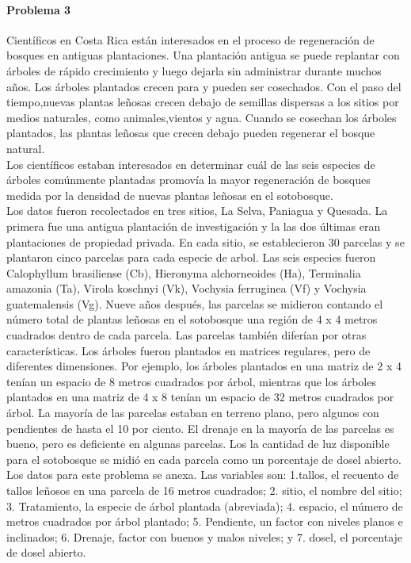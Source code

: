 \documentclass[12pt,a4paper]{report}
\begin{document}
\begin{enumerate}
\paragraph{Problema 3}
Científicos en Costa Rica están interesados en el proceso de regeneración de bosques en antiguas plantaciones. Una plantación antigua se puede replantar con árboles de rápido crecimiento y luego dejarla sin administrar durante muchos años. Los árboles plantados crecen para y pueden ser cosechados. Con el paso del tiempo,nuevas plantas leñosas crecen debajo de semillas dispersas a los sitios por medios naturales, como animales,vientos y agua. Cuando se cosechan los árboles plantados, las plantas leñosas que crecen debajo pueden regenerar el bosque natural.\\

Los científicos estaban interesados en determinar cuál de las seis especies de árboles comúnmente plantadas promovía la mayor regeneración de bosques medida por la densidad de nuevas plantas leñosas en el sotobosque.\\
Los datos fueron recolectados en tres sitios, La Selva, Paniagua y Quesada. La primera fue una antigua
plantación de investigación y la las dos últimas eran plantaciones de propiedad privada. En cada sitio, se establecieron 30 parcelas y se plantaron cinco parcelas para cada especie de arbol. Las seis especies fueron Calophyllum brasiliense (Cb), Hieronyma alchorneoides (Ha), Terminalia amazonia (Ta), Virola koschnyi (Vk), Vochysia ferruginea (Vf) y Vochysia guatemalensis (Vg). Nueve años después, las parcelas se midieron contando el número total de plantas leñosas en el sotobosque una región de 4 x 4 metros cuadrados dentro de cada parcela. Las parcelas también diferían por otras características. Los árboles fueron plantados en matrices regulares, pero de diferentes dimensiones. Por ejemplo, los árboles plantados en una matriz de 2 x 4 tenían un espacio de 8 metros cuadrados por árbol, mientras que los árboles plantados en una matriz de 4 x 8 tenían un espacio de 32 metros cuadrados por árbol. La mayoría de las parcelas estaban en terreno plano, pero algunos con pendientes de hasta el 10 por ciento. El drenaje en la mayoría de las parcelas es bueno, pero es deficiente en algunas parcelas. Los la cantidad de luz disponible para el sotobosque se midió en cada parcela como un porcentaje de dosel abierto. Los datos para este problema se anexa. Las variables son: 1.tallos, el recuento de tallos leñosos en una parcela de 16 metros cuadrados; 2. sitio, el nombre del sitio; 3. Tratamiento, la especie de árbol plantada (abreviada); 4. espacio, el número de metros cuadrados por árbol plantado; 5. Pendiente, un factor con niveles planos e inclinados; 6. Drenaje, factor con buenos y malos
niveles; y 7. dosel, el porcentaje de dosel abierto.\\\\


\end{enumerate}
\end{document}
